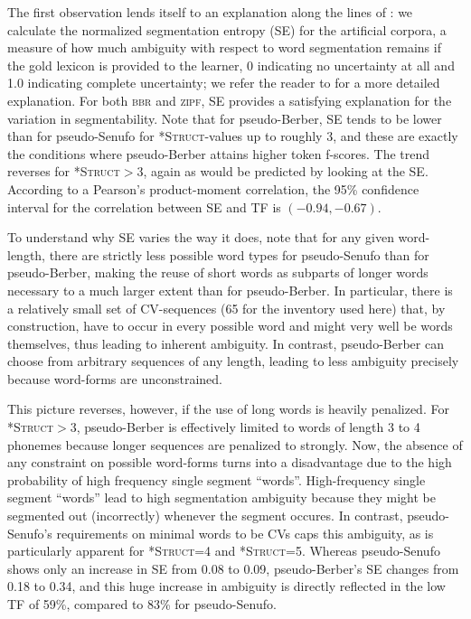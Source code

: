 \documentclass[11pt]{article}
\begin{document}
The first observation lends itself to an explanation along the lines of \cite{Fourtassi13a}: we calculate the normalized segmentation entropy (SE) for the artificial corpora, a measure of how much ambiguity with respect to word segmentation remains if the gold lexicon is provided to the learner, 0 indicating no uncertainty at all and 1.0 indicating complete uncertainty; we refer the reader to \cite{Fourtassi13a} for a more detailed explanation. For both \textsc{bbr} and \textsc{zipf}, SE provides a satisfying explanation for the variation in segmentability. Note that for pseudo-Berber, SE tends to be lower than for pseudo-Senufo for \textsc{*Struct}-values up to roughly 3, and these are exactly the conditions where pseudo-Berber attains higher token f-scores. The trend reverses for \textsc{*Struct}$>$3, again as would be predicted by looking at the SE. According to a Pearson's product-moment correlation, the 95\% confidence interval for the correlation between SE and TF is $(-0.94,-0.67)$.

To understand why SE varies the way it does, note that for any given word-length, there are strictly less possible word types for pseudo-Senufo than for pseudo-Berber, making the reuse of short words as subparts of longer words necessary to a much larger extent than for pseudo-Berber. In particular, there is a relatively small set of CV-sequences (65 for the inventory used here) that, by construction, have to occur in every possible word and might very well be words themselves, thus leading to inherent ambiguity. In contrast, pseudo-Berber can choose from arbitrary sequences of any length, leading to less ambiguity precisely because word-forms are unconstrained.

This picture reverses, however, if the use of long words is heavily penalized. For \textsc{*Struct}$>$3, pseudo-Berber is effectively limited to words of length 3 to 4 phonemes because longer sequences are penalized to strongly. Now, the absence of any constraint on possible word-forms turns into a disadvantage due to the high probability of high frequency single segment ``words''. High-frequency single segment ``words'' lead to high segmentation ambiguity because they might be segmented out (incorrectly) whenever the segment occures. In contrast, pseudo-Senufo's requirements on minimal words to be CVs caps this ambiguity, as is particularly apparent for \textsc{*Struct}=4 and \textsc{*Struct}=5. Whereas pseudo-Senufo shows only an increase in SE from 0.08 to 0.09, pseudo-Berber's SE changes from 0.18 to 0.34, and this huge increase in ambiguity is directly reflected in the low TF of 59\%, compared to 83\% for pseudo-Senufo.
\end{document}
